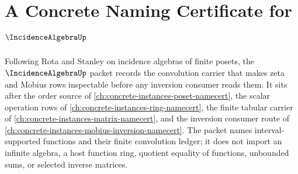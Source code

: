 \chapter{A Concrete Naming Certificate for $\IncidenceAlgebraUp$}
\label{ch:concrete-instances-incidence-algebra-namecert}

Following Rota and Stanley on incidence algebras of finite posets, the $\IncidenceAlgebraUp$ packet records the convolution carrier that makes zeta and Mobius rows inspectable before any inversion consumer reads them. It sits after the order source of \autoref{ch:concrete-instances-poset-namecert}, the scalar operation rows of \autoref{ch:concrete-instances-ring-namecert}, the finite tabular carrier of \autoref{ch:concrete-instances-matrix-namecert}, and the inversion consumer route of \autoref{ch:concrete-instances-mobius-inversion-namecert}. The packet names interval-supported functions and their finite convolution ledger; it does not import an infinite algebra, a host function ring, quotient equality of functions, unbounded sums, or selected inverse matrices.

